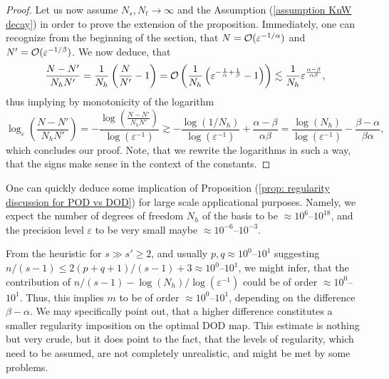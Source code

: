 \begin{proof}
    Let us now assume $N_s, N_t \to \infty$ and the Assumption (\ref{assumption KnW decay}) in order
    to prove the extension of the proposition. Immediately, one can recognize from the beginning of
    the section, that $N = \mathcal{O}(\varepsilon^{-1/\alpha})$ and $N' = \mathcal{O}(\varepsilon^{-1/\beta})$.
    We now deduce, that
    \begin{equation*}
        \frac{N - N'}{N_h N'} = \frac{1}{N_h} \left( \frac{N}{N'} - 1 \right) = \mathcal{O}\left( 
            \frac{1}{N_h} \left( \varepsilon^{-\frac{1}{\alpha} + \frac{1}{\beta}} - 1 \right) \right)
            \lesssim \frac{1}{N_h} \varepsilon^{\frac{\alpha - \beta}{\alpha \beta}},
    \end{equation*}
    thus implying by monotonicity of the logarithm
    \begin{equation*}
        \log_\varepsilon\left(\frac{N-N'}{N_h N'}\right) = 
        -\frac{\log\left(\frac{N-N'}{N_h N'}\right)}{\log(\varepsilon^{-1})}
        \gtrsim -\frac{\log(1/N_h)}{\log(\varepsilon^{-1})} + \frac{\alpha - \beta}{\alpha \beta}
        = \frac{\log(N_h)}{\log(\varepsilon^{-1})} - \frac{\beta - \alpha}{\beta \alpha},
    \end{equation*}
    which concludes our proof. Note, that we rewrite the logarithms in such a way, that the signs make sense
    in the context of the constants.
\end{proof}

\begin{remark}[Discussion]
    One can quickly deduce some implication of Proposition 
    (\ref{prop: regularity discussion for POD vs DOD}) for large scale applicational purposes. Namely, we 
    expect the number of degrees of freedom $N_h$ of the basis to be $\approx 10^6$--$10^{18}$, and
    the precision level $\varepsilon$ to be very small maybe $\approx 10^{-6}$--$10^{-3}$. 

    From the heuristic for $s \gg s' \geq 2$, and usually $p, q \approx 10^0$--$10^1$ suggesting
    $n/(s-1) \leq 2(p+q+1)/(s-1)+3 \approx 10^0$--$10^1$, 
    we might infer, that the contribution of $n/(s-1) - \log(N_h)/\log(\varepsilon^{-1})$
    could be of order $\approx 10^0$--$10^1$.
    Thus, this implies $m$ to be of order $\approx 10^0$--$10^1$, depending on the difference $\beta - \alpha$.
    We may specifically point out, that a higher difference constitutes a smaller regularity imposition
    on the optimal DOD map. This estimate is nothing but very crude, but it does point to the fact, that
    the levels of regularity, which need to be assumed, are not completely unrealistic, and might be met by some 
    problems.
\end{remark}

